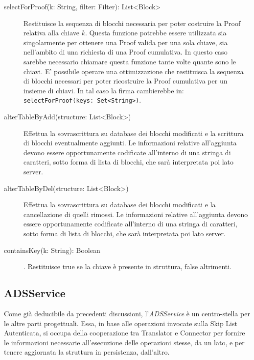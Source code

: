 \begin{description}
			\item[selectForProof(k: String, filter: Filter): List<Block>] Restituisce la sequenza di blocchi necessaria per poter costruire la Proof relativa alla chiave $ k $. Questa funzione potrebbe essere utilizzata sia singolarmente per ottenere una Proof valida per una sola chiave, sia nell'ambito di una richiesta di una Proof cumulativa. In questo caso sarebbe necessario chiamare questa funzione tante volte quante sono le chiavi. E' possibile operare una ottimizzazione che restituisca la sequenza di blocchi necessari per poter ricostruire la Proof cumulativa per un insieme di chiavi. In tal caso la firma cambierebbe in: \verb!selectForProof(keys: Set<String>)!. 
			\item[alterTableByAdd(structure: List<Block>)] Effettua la sovrascrittura su database dei blocchi modificati e la scrittura di blocchi eventualmente aggiunti. Le informazioni relative all'aggiunta devono essere opportunamente codificate all'interno di una stringa di caratteri, sotto forma di lista di blocchi, che sarà interpretata poi lato server.
			\item[alterTableByDel(structure: List<Block>)] Effettua la sovrascrittura su database dei blocchi modificati e la cancellazione di quelli rimossi. Le informazioni relative all'aggiunta devono essere opportunamente codificate all'interno di una stringa di caratteri, sotto forma di lista di blocchi, che sarà interpretata poi lato server.
			\item[containsKey(k: String): Boolean]. Restituisce true se la chiave è presente in struttura, false altrimenti.
		\end{description}
		
	
	\subsection{ADSService}
	

		Come già deducibile da precedenti discussioni, l'\textit{ADSService} è un centro-stella per le altre parti progettuali. Essa, in base alle operazioni invocate sulla Skip List Autenticata, si occupa della cooperazione tra Translator e Connector per fornire le informazioni necessarie all'esecuzione delle operazioni stesse, da un lato, e per tenere aggiornata la struttura in persistenza, dall'altro.
		
